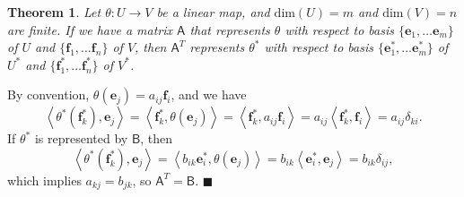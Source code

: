 \documentclass[letter-paper]{tufte-book}
\newtheorem{theorem}{\color{pastel-blue}Theorem}[section]
\newenvironment{proof}[1][Proof]{\begin{trivlist}
\item[\hskip \labelsep {\bfseries #1}]}{\end{trivlist}}
\newcommand{\inner}[2]{\left\langle #1, #2\right\rangle}
\newcommand{\As}{{\mathsf{A}}}
\newcommand{\Bs}{{\mathsf{B}}}
\newcommand{\eb}{{\boldsymbol{e}}}
\newcommand{\fb}{{\boldsymbol{f}}}
\newcommand{\qed}{\hfill$\blacksquare$}
\begin{document}
\begin{theorem}
  Let $\theta : U \to V$ be a linear map, and $\mbox{dim}(U) = m$ and $\mbox{dim}(V) = n$ are finite. If we have a matrix $\As$ that represents $\theta$ with respect to basis $\{\eb_1, \ldots \eb_m\}$ of $U$ and $\{\fb_1, \ldots \fb_n\}$ of $V$, then $\As^T$ represents $\theta^*$ with respect to basis $\{\eb^*_1, \ldots \eb^*_m\}$ of $U^*$ and $\{\fb^*_1, \ldots \fb^*_n\}$ of $V^*$.
\end{theorem}

\begin{proof}
  By convention, $\theta(\eb_j) = a_{ij}\fb_i$, and we have
  \begin{equation*}
    \inner{\theta^*(\fb^*_k)}{\eb_j} = \inner{\fb^*_k}{\theta(\eb_j)} = \inner{\fb^*_k}{a_{ij}\fb_i} = a_{ij}\inner{\fb^*_k}{\fb_i} = a_{ij}\delta_{ki}.
  \end{equation*}
  If $\theta^*$ is represented by $\Bs$, then
  \begin{equation*}
    \inner{\theta^*(\fb^*_k)}{\eb_j} = \inner{b_{ik}\eb^*_i}{\theta(\eb_j)} = b_{ik}\inner{\eb^*_i}{\eb_j} = b_{ik}\delta_{ij},
  \end{equation*}
  which implies $a_{kj} = b_{jk}$, so $\As^T = \Bs$. \qed
\end{proof}
\end{document}
